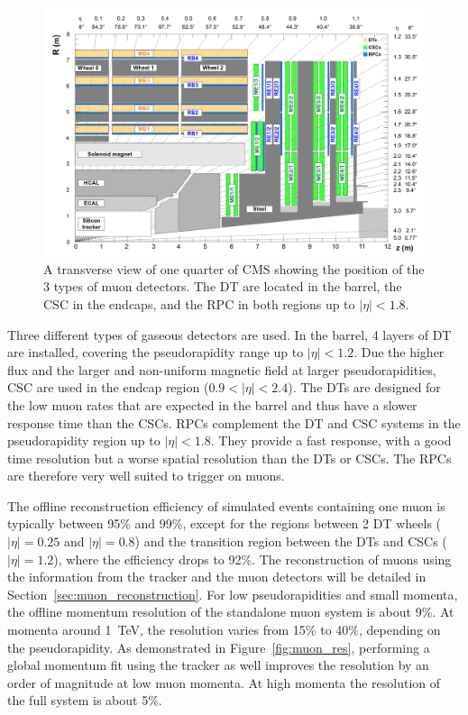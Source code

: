 \begin{figure}[ht]
  \centering
 \includegraphics[width=.9\textwidth]{muon_system_new}
 \caption{A transverse view of one quarter of \ac{CMS} showing the position of the 3 types of muon detectors. The \protect\acf{DT} are located in the barrel, the \protect\acf{CSC} in the endcaps, and the \protect\acf{RPC} in both regions up to $|\eta| < 1.8$.}
 \label{fig:muons}
\end{figure}

Three different types of gaseous detectors are used. In the barrel, 4 layers of \ac{DT} are installed, covering the pseudorapidity range up to $|\eta| < 1.2$. Due the higher flux and the larger and non-uniform magnetic field at larger pseudorapidities, \ac{CSC} are used in the endcap region ($0.9 < |\eta| < 2.4$). The \acp{DT} are designed for the low muon rates that are expected in the barrel and thus have a slower response time than the \acp{CSC}. \acp{RPC} complement the \ac{DT} and \ac{CSC} systems in the pseudorapidity region up to $|\eta| < 1.8$. They provide a fast response, with a good time resolution but a worse spatial resolution than the \acp{DT} or \acp{CSC}. The \acp{RPC} are therefore very well suited to trigger on muons.

The offline reconstruction efficiency of simulated events containing one muon is typically between 95\% and 99\%, except for the regions between 2 \ac{DT} wheels ($|\eta| = 0.25$ and $|\eta| = 0.8$) and the transition region between the \acp{DT} and \acp{CSC} ($|\eta| = 1.2$), where the efficiency drops to 92\%. The reconstruction of muons using the information from the tracker and the muon detectors will be detailed in Section~\ref{sec:muon_reconstruction}. For low pseudorapidities and small momenta, the offline momentum resolution of the standalone muon system is about 9\%. At momenta around \SI{1}{TeV}, the resolution varies from 15\% to 40\%, depending on the pseudorapidity. As demonstrated in Figure~\ref{fig:muon_res}, performing a global momentum fit using the tracker as well improves the resolution by an order of magnitude at low muon momenta. At high momenta the resolution of the full system is about 5\%.

